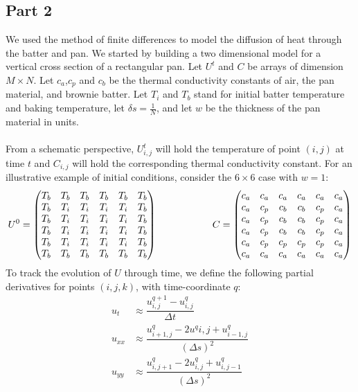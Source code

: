 \documentclass[12pt]{reedmcm}
\begin{document}
\subsection{Part 2}
We used the method of finite differences to model the diffusion of heat through the batter and pan.  We started by building a two dimensional model for a vertical cross section of a rectangular pan.  Let $U^t$ and $C$ be arrays of dimension $M \times N$.  Let $c_a$,$c_p$ and $c_b$ be the thermal conductivity constants of air, the pan material, and brownie batter.  Let $T_i$ and $T_b$ stand for initial batter temperature and baking temperature, let $\delta s = \frac{1}{N}$, and let $w$ be the thickness of the pan material in units.\\
\\
From a schematic perspective, $U^t_{i,j}$ will hold the temperature of point $(i,j)$ at time $t$ and $C_{i,j}$ will hold the corresponding thermal conductivity constant.  For an illustrative example of initial conditions, consider the $6 \times 6$ case with $w = 1$:
\[U^0 = \begin{pmatrix} T_b&T_b&T_b&T_b&T_b&T_b\\
					T_b&T_i &T_i&T_i&T_i&T_b\\
					T_b&T_i &T_i&T_i&T_i&T_b\\
					T_b&T_i &T_i&T_i&T_i&T_b\\
					T_b&T_i &T_i&T_i&T_i&T_b\\
					T_b&T_b&T_b&T_b&T_b&T_b \end{pmatrix} \hspace{20mm}
  C = \begin{pmatrix} c_a&c_a&c_a&c_a&c_a&c_a\\
				   c_a &c_p &c_b&c_b&c_p&c_a\\
				    c_a &c_p &c_b&c_b&c_p&c_a\\
  				 c_a &c_p &c_b&c_b&c_p&c_a\\
				 c_a &c_p &c_p&c_p&c_p&c_a\\
				c_a&c_a&c_a&c_a&c_a&c_a \end{pmatrix} \]		
To track the evolution of $U$ through time, we define the following partial derivatives for points $(i,j,k)$, with time-coordinate $q$: \begin{align*}
u_t &\approx \dfrac{u_{i,j}^{q+1} - u_{i,j}^q}{\Delta t}\\
u_{xx} &\approx \dfrac{u_{i+1,j}^q - 2u^q{i,j} + u_{i-1,j}^q}{(\Delta s)^2}\\
u_{yy} &\approx \dfrac{u_{i,j+1}^q - 2u_{i,j}^q + u_{i,j-1}^q}{(\Delta s)^2} \end{align*}
\end{document}
